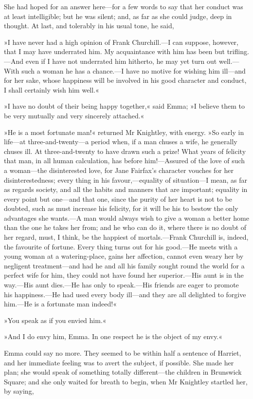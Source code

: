 She had hoped for an answer here—for a few words to say that her conduct was at least intelligible; but he was silent; and, as far as she could judge, deep in thought. At last, and tolerably in his usual tone, he said,

»I have never had a high opinion of Frank Churchill.—I can suppose, however, that I may have underrated him. My acquaintance with him has been but trifling.—And even if I have not underrated him hitherto, he may yet turn out well.—With such a woman he has a chance.—I have no motive for wishing him ill—and for her sake, whose happiness will be involved in his good character and conduct, I shall certainly wish him well.«

»I have no doubt of their being happy together,« said Emma; »I believe them to be very mutually and very sincerely attached.«

»He is a most fortunate man!« returned Mr Knightley, with energy. »So early in life—at three-and-twenty—a period when, if a man chuses a wife, he generally chuses ill. At three-and-twenty to have drawn such a prize! What years of felicity that man, in all human calculation, has before him!—Assured of the love of such a woman—the disinterested love, for Jane Fairfax's character vouches for her disinterestedness; every thing in his favour,—equality of situation—I mean, as far as regards society, and all the habits and manners that are important; equality in every point but one—and that one, since the purity of her heart is not to be doubted, such as must increase his felicity, for it will be his to bestow the only advantages she wants.—A man would always wish to give a woman a better home than the one he takes her from; and he who can do it, where there is no doubt of her regard, must, I think, be the happiest of mortals.—Frank Churchill is, indeed, the favourite of fortune. Every thing turns out for his good.—He meets with a young woman at a watering-place, gains her affection, cannot even weary her by negligent treatment—and had he and all his family sought round the world for a perfect wife for him, they could not have found her superior.—His aunt is in the way.—His aunt dies.—He has only to speak.—His friends are eager to promote his happiness.—He had used every body ill—and they are all delighted to forgive him.—He is a fortunate man indeed!«

»You speak as if you envied him.«

»And I do envy him, Emma. In one respect he is the object of my envy.«

Emma could say no more. They seemed to be within half a sentence of Harriet, and her immediate feeling was to avert the subject, if possible. She made her plan; she would speak of something totally different—the children in Brunswick Square; and she only waited for breath to begin, when Mr Knightley startled her, by saying,

